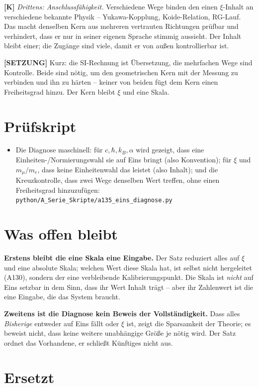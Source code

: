 \textbf{[K]} \emph{Drittens: Anschlussfähigkeit.} Verschiedene Wege binden den
einen $\xi$-Inhalt an verschiedene bekannte Physik -- Yukawa-Kopplung,
Koide-Relation, RG-Lauf. Das macht denselben Kern aus mehreren vertrauten
Richtungen prüfbar und verhindert, dass er nur in seiner eigenen Sprache
stimmig aussieht. Der Inhalt bleibt einer; die Zugänge sind viele, damit er von
außen kontrollierbar ist.

\textbf{[SETZUNG]} Kurz: die SI-Rechnung ist Übersetzung, die mehrfachen Wege
sind Kontrolle. Beide sind nötig, um den geometrischen Kern mit der Messung zu
verbinden und ihn zu härten -- keiner von beiden fügt dem Kern einen
Freiheitsgrad hinzu. Der Kern bleibt $\xi$ und eine Skala.

\section{Prüfskript}

\begin{itemize}
  \item Die Diagnose maschinell: für $c, \hbar, k_B, \alpha$ wird gezeigt, dass
    eine Einheiten-/Normierungswahl sie auf Eins bringt (also Konvention); für
    $\xi$ und $m_\mu/m_e$, dass keine Einheitenwahl das leistet (also Inhalt);
    und die Kreuzkontrolle, dass zwei Wege denselben Wert treffen, ohne einen
    Freiheitsgrad hinzuzufügen:
    \texttt{python/A\_Serie\_Skripte/a135\_eins\_diagnose.py}
\end{itemize}

\section{Was offen bleibt}

\textbf{Erstens bleibt die eine Skala eine Eingabe.} Der Satz reduziert alles auf
$\xi$ und eine absolute Skala; welchen Wert diese Skala hat, ist selbst nicht
hergeleitet (A130), sondern der eine verbleibende Kalibrierungspunkt. Die Skala
ist \emph{nicht} auf Eins setzbar in dem Sinn, dass ihr Wert Inhalt trägt --
aber ihr Zahlenwert ist die eine Eingabe, die das System braucht.

\textbf{Zweitens ist die Diagnose kein Beweis der Vollständigkeit.} Dass alles
\emph{Bisherige} entweder auf Eins fällt oder $\xi$ ist, zeigt die
Sparsamkeit der Theorie; es beweist nicht, dass keine weitere unabhängige Größe
je nötig wird. Der Satz ordnet das Vorhandene, er schließt Künftiges nicht aus.

\section{Ersetzt}

